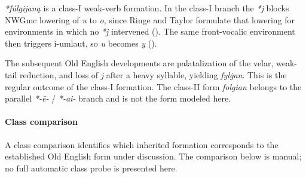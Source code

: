 \documentclass[
  british,
  a4paper,
]{article}
\begin{document}
\emph{*fúlgijaną} is a class-I weak-verb formation. In the class-I
branch the \emph{*j} blocks NWGmc lowering of \emph{u} to \emph{o},
since Ringe and Taylor formulate that lowering for environments in which
no \emph{*j} intervened (). The same front-vocalic environment then triggers i-umlaut,
so \emph{u} becomes \emph{y} ().

The subsequent Old English developments are palatalization of the velar,
weak-tail reduction, and loss of \emph{j} after a heavy syllable,
yielding \emph{fylġan}. This is the regular outcome of the class-I
formation. The class-II form \emph{folgian} belongs to the parallel
\emph{*-ē-} / \emph{*-ai-} branch and is not the form modeled here.

\paragraph{Class comparison}\label{class-comparison-1}

A class comparison identifies which inherited formation corresponds to
the established Old English form under discussion. The comparison below
is manual; no full automatic class probe is presented here.
\end{document}
